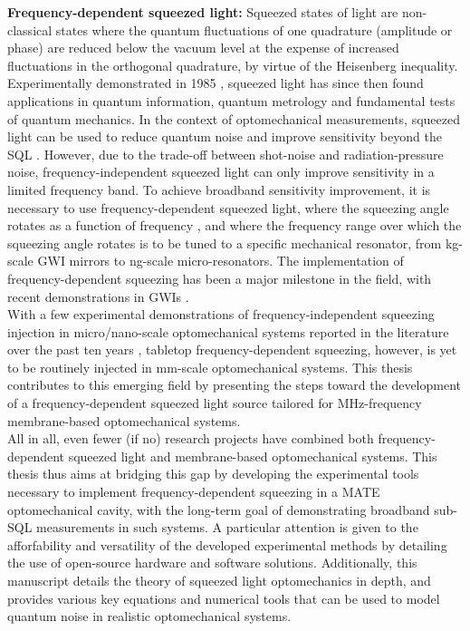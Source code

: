 \noindent \textbf{Frequency-dependent squeezed light:} Squeezed states of light are non-classical states where the quantum fluctuations of one quadrature (amplitude or phase) are reduced below the vacuum level at the expense of increased fluctuations in the orthogonal quadrature, by virtue of the Heisenberg inequality. Experimentally demonstrated in 1985 \cite{slusher1985squeezed}, squeezed light has since then found applications in quantum information, quantum metrology and fundamental tests of quantum mechanics. In the context of optomechanical measurements, squeezed light can be used to reduce quantum noise and improve sensitivity beyond the SQL \cite{caves1981}. However, due to the trade-off between shot-noise and radiation-pressure noise, frequency-independent squeezed light can only improve sensitivity in a limited frequency band. To achieve broadband sensitivity improvement, it is necessary to use frequency-dependent squeezed light, where the squeezing angle rotates as a function of frequency \cite{klmtv}, and where the frequency range over which the squeezing angle rotates is to be tuned to a specific mechanical resonator, from kg-scale GWI mirrors to ng-scale micro-resonators. The implementation of frequency-dependent squeezing has been a major milestone in the field, with recent demonstrations in GWIs \cite{ Virgo2023, LIGO2020}. \\


With a few experimental demonstrations of frequency-independent squeezing injection in micro/nano-scale optomechanical systems reported in the literature over the past ten years \cite{hoff2013_quantumEnhancedMicromechanical, schafermeier2016_quantumEnhancedFeedbackCooling, clark2016_observationStrongRadiationPressure,li2018_quantumEnhancedOptomechanicalMagnetometry, xia2023_entanglementEnhancedOptomechanicalSensing, Schnabel2020, Yap2020}, tabletop frequency-dependent squeezing, however, is yet to be routinely injected in mm-scale optomechanical systems. This thesis contributes to this emerging field by presenting the steps toward the development of a frequency-dependent squeezed light source tailored for MHz-frequency membrane-based optomechanical systems. \\ 



All in all, even fewer (if no) research projects have combined both frequency-dependent squeezed light and membrane-based optomechanical systems. This thesis thus aims at bridging this gap by developing the experimental tools necessary to implement frequency-dependent squeezing in a MATE optomechanical cavity, with the long-term goal of demonstrating broadband sub-SQL measurements in such systems. A particular attention is given to the afforfability and versatility of the developed experimental methods by detailing the use of open-source hardware and software solutions. Additionally, this manuscript details the theory of squeezed light optomechanics in depth, and provides various key equations and numerical tools that can be used to model quantum noise in realistic optomechanical systems.


